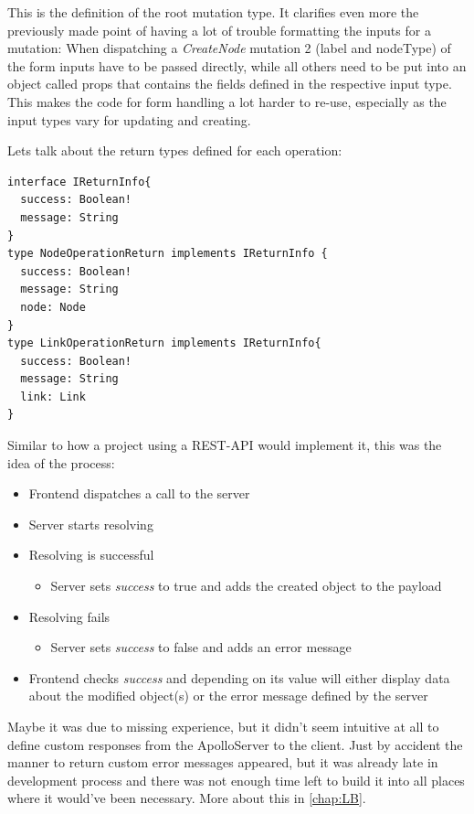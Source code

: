 This is the definition of the root mutation type. It clarifies even more the previously made point of having a lot of trouble formatting the inputs for a mutation: When dispatching a \emph{CreateNode} mutation 2 (label and nodeType) of the form inputs have to be passed directly, while all others need to be put into an object called props that contains the fields defined in the respective input type. This makes the code for form handling a lot harder to re-use, especially as the input types vary for updating and creating.

Lets talk about the return types defined for each operation:
\begin{lstlisting}
interface IReturnInfo{
  success: Boolean!
  message: String
}
type NodeOperationReturn implements IReturnInfo {
  success: Boolean!
  message: String
  node: Node
}
type LinkOperationReturn implements IReturnInfo{
  success: Boolean!
  message: String
  link: Link
}
\end{lstlisting}
Similar to how a project using a REST-API would implement it, this was the idea of the process:
\begin{itemize}
\item Frontend dispatches a call to the server
\item Server starts resolving
\item Resolving is successful
	\begin{itemize}
		\item Server sets \emph{success} to true and adds the created object to the payload
	\end{itemize}
\item Resolving fails
	\begin{itemize}
		\item Server sets \emph{success} to false and adds an error message
	\end{itemize}

\item Frontend checks \emph{success} and depending on its value will either display data about the modified object(s) or the error message defined by the server
\end{itemize}

Maybe it was due to missing experience, but it didn't seem intuitive at all to define custom responses from the ApolloServer to the client. Just by accident the manner to return custom error messages appeared, but it was already late in development process and there was not enough time left to build it into all places where it would've been necessary. More about this in \autoref{chap:LB}.

